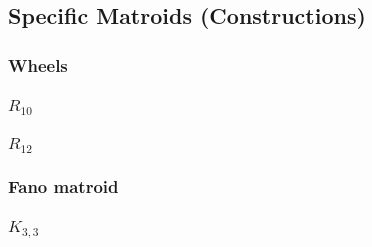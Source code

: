 \subsection{Specific Matroids (Constructions)}

\subsubsection{Wheels}

\begin{definition}[wheel]
  \label{def:wheel}
\end{definition}

\begin{definition}[$W_{3}$]
  \label{def:M_W_3}
\end{definition}

\begin{definition}[$W_{4}$]
  \label{def:M_W_4}
\end{definition}

\subsubsection{$R_{10}$}

\begin{definition}[$R_{10}$]
  \label{def:R10}
\end{definition}

\subsubsection{$R_{12}$}

\begin{definition}[$R_{12}$]
  \label{def:R12}
\end{definition}

\subsubsection{Fano matroid}

\begin{definition}[$F_{7}$]
  \label{def:F7}
\end{definition}

\subsubsection{$K_{3,3}$}

